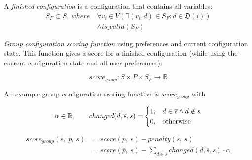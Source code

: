 A \emph{finished configuration} is a configuration that contains all variables:
\begin{equation}
\begin{split}
    S_F \subset S,\ where \  & \forall v_i \in V (\exists (v_i, d) \in S_F : d \in \mathfrak{D}(i)) \\
    & \land is\_valid(S_F)
\end{split}
\end{equation}


\emph{Group configuration scoring function} using preferences and current configuration state. This function gives a score for a finished configuration (while using the current configuration state and all user preferences):

\begin{equation}
    score_{group}: S \times P \times S_F \to \mathbb{R}
\end{equation}

An example group configuration scoring function is $score_{group}$ with

\begin{equation}
    \notag \alpha \in \mathbb{R}, \qquad     changed(d,\overline{s}, s) = 
    \begin{cases}
      1, & d \in \overline{s} \land d \notin s \\
      0, & \text{otherwise}
    \end{cases}
\end{equation}

\begin{equation}
    \begin{split}
        score_{group}(\overline{s},\ \overline{p},\ s)
        & = score(\overline{p},\ s) - penalty(\overline{s},\ s) \\
        & = score(\overline{p},\ s) - \sum_{d \in \overline{s}} changed(d,\overline{s}, s) \cdot \alpha
    \end{split}
\end{equation}

